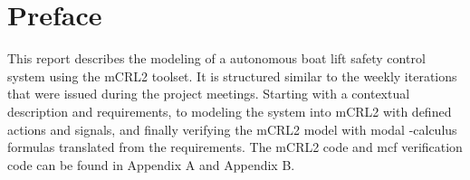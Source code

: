 \section{Preface}
This report describes the modeling of a autonomous boat lift safety control system using the mCRL2 toolset. It is structured similar to the weekly iterations that were issued during the project meetings. Starting with a contextual description and requirements, to modeling the system into mCRL2 with defined actions and signals, and finally verifying the mCRL2 model with modal {\textmu}-calculus formulas translated from the requirements. The mCRL2 code and mcf verification code can be found in Appendix A and Appendix B. 



